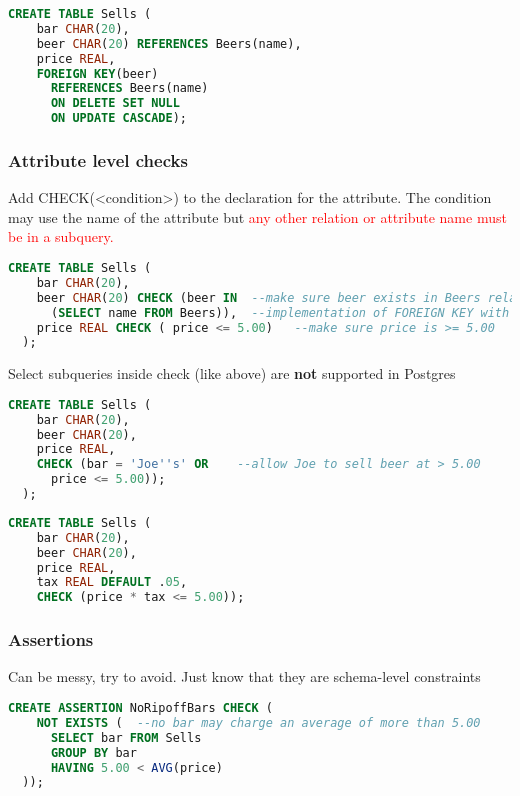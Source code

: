 \documentclass[12pt]{article}
\begin{document}
\begin{lstlisting}[language=sql,caption=setting policy]
  CREATE TABLE Sells (
    bar CHAR(20),
    beer CHAR(20) REFERENCES Beers(name),
    price REAL,
    FOREIGN KEY(beer)
      REFERENCES Beers(name)
      ON DELETE SET NULL
      ON UPDATE CASCADE);
\end{lstlisting}

\subsubsection{Attribute level checks}
Add CHECK(<condition>) to the declaration for the attribute.
The condition may use the name of the attribute but
\textcolor{red}{any other relation or attribute name must be in a subquery.}

\begin{lstlisting}[language=sql,caption=attribute check]
  CREATE TABLE Sells (
    bar CHAR(20),
    beer CHAR(20) CHECK (beer IN  --make sure beer exists in Beers relation
      (SELECT name FROM Beers)),  --implementation of FOREIGN KEY with a CHECK
    price REAL CHECK ( price <= 5.00)   --make sure price is >= 5.00
  );
\end{lstlisting}
Select subqueries inside check (like above) are \textbf{not} supported in Postgres
\begin{lstlisting}[language=sql,caption=tuple-based check]
  CREATE TABLE Sells (
    bar CHAR(20),
    beer CHAR(20),
    price REAL,
    CHECK (bar = 'Joe''s' OR    --allow Joe to sell beer at > 5.00
      price <= 5.00));
  );
\end{lstlisting}
\begin{lstlisting}[language=sql,caption=operation in check]
  CREATE TABLE Sells (
    bar CHAR(20),
    beer CHAR(20),
    price REAL,
    tax REAL DEFAULT .05,
    CHECK (price * tax <= 5.00));
\end{lstlisting}

\subsubsection{Assertions}
Can be messy, try to avoid. Just know that they are schema-level constraints
\begin{lstlisting}[language=sql,caption=assertion]
  CREATE ASSERTION NoRipoffBars CHECK (
    NOT EXISTS (  --no bar may charge an average of more than 5.00
      SELECT bar FROM Sells
      GROUP BY bar
      HAVING 5.00 < AVG(price)
  ));
\end{lstlisting}
\end{document}
